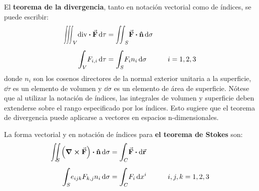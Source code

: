 \documentclass[hidelinks,12pt]{article}
\def\scaleint#1{\vcenter{\hbox{\scaleto[3ex]{\displaystyle\int}{#1}}}}
\def\scaleiint#1{\vcenter{\hbox{\scaleto[3ex]{\displaystyle\iint}{#1}}}}
\def\scaleiiint#1{\vcenter{\hbox{\scaleto[3ex]{\displaystyle\iiint}{#1}}}}
\def\bs{\mkern-12mu}
\begin{document}
El \textbf{teorema de la divergencia}, tanto en notación vectorial como de índices, se puede escribir:
\begin{align}
\begin{aligned}
\scaleiiint{6ex}_{V} \text{div} \vdot \va{F} \dd{\tau} &= \scaleiint{6ex}_{S} \va{F} \vdot \vu{n} \dd{\sigma} \\[0.5em]
\scaleint{6ex}_{\bs V} F_{i, i} \dd{\tau} &= \scaleint{6ex}_{\bs S} F_{i} n_{i} \dd{\sigma} \hspace{1cm} i = 1, 2, 3
\end{aligned}
\label{eq:ecuacion_01_01_16}
\end{align}
donde $n_{i}$ son los cosenos directores de la normal exterior unitaria a la superficie, $\dd{\tau}$ es un elemento de volumen y $\dd{\sigma}$ es un elemento de área de superficie. Nótese que al utilizar la notación de índices, las integrales de volumen y superficie deben extenderse sobre el rango especificado por los índices. Esto sugiere que el teorema de divergencia puede aplicarse a vectores en espacios n-dimensionales.
\par
La forma vectorial y en notación de índices para \textbf{el teorema de Stokes} son:
\begin{align}
\begin{aligned}
\scaleiint{6ex}_{\bs S} \left( \curl{\va{F}} \right) \vdot \vu{n} \dd{\sigma} &= \scaleint{6ex}_{\bs C} \va{F} \vdot \dd{\va{r}} \\[0.5em]
\scaleint{6ex}_{\bs S} e_{ijk} F_{k,j} n_{i} \dd{\sigma} &= \scaleint{6ex}_{\bs C} F_{i} \dd{x^{i}} \hspace{1cm} i, j, k = 1, 2, 3
\end{aligned}
\label{eq:ecuacion_01_01_17}
\end{align}
\end{document}
